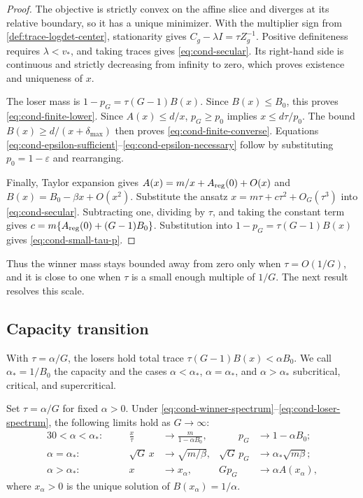 \begin{proof}
The objective is strictly convex on the affine slice and diverges at its
relative boundary, so it has a unique minimizer.  With the multiplier sign
from \cref{def:trace-logdet-center}, stationarity gives
$C_g-\lambda I=\tau Z_g^{-1}$.  Positive definiteness requires
$\lambda<v_*$, and taking traces gives \eqref{eq:cond-secular}.  Its
right-hand side is continuous and strictly decreasing from infinity to zero,
which proves existence and uniqueness of $x$.

The loser mass is $1-p_G=\tau(G-1)B(x)$.  Since $B(x)\le B_0$, this proves
\eqref{eq:cond-finite-lower}.  Since $A(x)\le d/x$, $p_G\ge p_0$ implies
$x\le d\tau/p_0$.  The bound
$B(x)\ge d/(x+\delta_{\max})$ then proves
\eqref{eq:cond-finite-converse}.  Equations
\eqref{eq:cond-epsilon-sufficient}--\eqref{eq:cond-epsilon-necessary} follow
by substituting $p_0=1-\varepsilon$ and rearranging.

Finally, Taylor expansion gives
$A(x)=m/x+A_{\rm reg}(0)+O(x)$ and
$B(x)=B_0-\beta x+O(x^2)$.  Substitute the ansatz
$x=m\tau+c\tau^2+O_G(\tau^3)$ into \eqref{eq:cond-secular}.  Subtracting
one, dividing by $\tau$, and taking the constant term gives
$c=m\{A_{\rm reg}(0)+(G-1)B_0\}$.  Substitution into
$1-p_G=\tau(G-1)B(x)$ gives \eqref{eq:cond-small-tau-p}.
\end{proof}

Thus the winner mass stays bounded away from zero only when $\tau=O(1/G)$,
and it is close to one when $\tau$ is a small enough multiple of $1/G$.
The next result resolves this scale.

\subsection{Capacity transition}
\label{sec:condensation-threshold}

With $\tau=\alpha/G$, the losers hold total trace
$\tau(G-1)B(x)<\alpha B_0$.  We call $\alpha_*=1/B_0$ the capacity and the
cases $\alpha<\alpha_*$, $\alpha=\alpha_*$, and $\alpha>\alpha_*$
subcritical, critical, and supercritical.

\begin{theorem}
\label{thm:condensation-threshold}
Set $\tau=\alpha/G$ for fixed $\alpha>0$.  Under
\eqref{eq:cond-winner-spectrum}--\eqref{eq:cond-loser-spectrum}, the following
limits hold as $G\to\infty$:
\begin{alignat}{3}
 0<\alpha<\alpha_*:&\quad
 &\frac{x}{\tau}&\longrightarrow\frac{m}{1-\alpha B_0},
 &\qquad p_G&\longrightarrow1-\alpha B_0;                 \label{eq:cond-subcritical}\\
 \alpha=\alpha_*:&
 &\sqrt G\,x&\longrightarrow\sqrt{m/\beta},
 &\sqrt G\,p_G&\longrightarrow\alpha_*\sqrt{m\beta};    \label{eq:cond-critical}\\
 \alpha>\alpha_*:&
 &x&\longrightarrow x_\alpha,
 &G p_G&\longrightarrow\alpha A(x_\alpha),               \label{eq:cond-supercritical}
\end{alignat}
where $x_\alpha>0$ is the unique solution of
$B(x_\alpha)=1/\alpha$.
\end{theorem}

